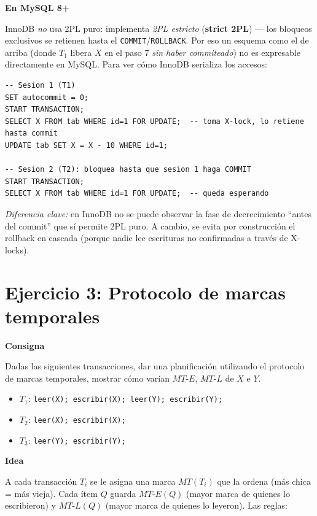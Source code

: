 \documentclass[11pt,a4paper]{article}
\newcommand{\itemcabecera}[1]{\noindent\textbf{#1}\par\medskip}
\newcommand{\bloqueConsigna}{\itemcabecera{Consigna}}
\newcommand{\bloqueIdea}{\itemcabecera{Idea}}
\newcommand{\bloqueMySQL}{\itemcabecera{En MySQL 8+}}
\begin{document}
\bloqueMySQL

InnoDB \emph{no} usa 2PL puro: implementa \emph{2PL estricto} (\textbf{strict 2PL}) --- los bloqueos exclusivos se retienen hasta el \texttt{COMMIT}/\texttt{ROLLBACK}. Por eso un esquema como el de arriba (donde $T_1$ libera $X$ en el paso 7 \emph{sin haber commiteado}) no es expresable directamente en MySQL. Para ver cómo InnoDB serializa los accesos:

\begin{lstlisting}
-- Sesion 1 (T1)
SET autocommit = 0;
START TRANSACTION;
SELECT X FROM tab WHERE id=1 FOR UPDATE;  -- toma X-lock, lo retiene hasta commit
UPDATE tab SET X = X - 10 WHERE id=1;

-- Sesion 2 (T2): bloquea hasta que sesion 1 haga COMMIT
START TRANSACTION;
SELECT X FROM tab WHERE id=1 FOR UPDATE;  -- queda esperando
\end{lstlisting}

\textit{Diferencia clave:} en InnoDB no se puede observar la fase de decrecimiento ``antes del commit'' que sí permite 2PL puro. A cambio, se evita por construcción el rollback en cascada (porque nadie lee escrituras no confirmadas a través de X-locks).

\section{Ejercicio 3: Protocolo de marcas temporales}

\bloqueConsigna

Dadas las siguientes transacciones, dar una planificación utilizando el protocolo de marcas temporales, mostrar cómo varían $MT\text{-}E$, $MT\text{-}L$ de $X$ e $Y$.

\begin{itemize}
    \item $T_1$: \texttt{leer(X); escribir(X); leer(Y); escribir(Y);}
    \item $T_2$: \texttt{leer(X); escribir(X);}
    \item $T_3$: \texttt{leer(Y); escribir(Y);}
\end{itemize}

\bloqueIdea

A cada transacción $T_i$ se le asigna una marca $MT(T_i)$ que la ordena (más chica = más vieja). Cada ítem $Q$ guarda $MT\text{-}E(Q)$ (mayor marca de quienes lo escribieron) y $MT\text{-}L(Q)$ (mayor marca de quienes lo leyeron). Las reglas:
\end{document}
